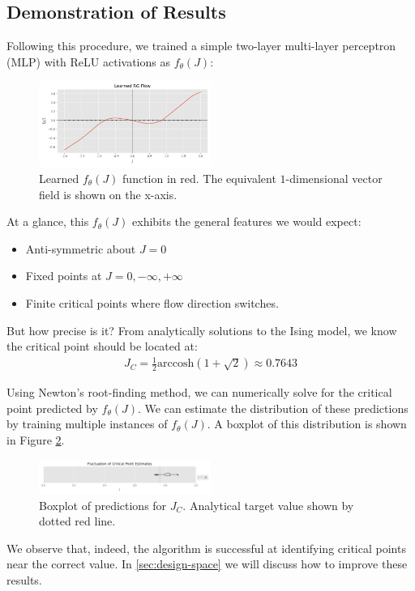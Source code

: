 \documentclass[%
    reprint,
    amsmath,amssymb,
    aps,
]{revtex4-2}
\begin{document}
\subsection{Demonstration of Results}

Following this procedure, we trained a simple two-layer multi-layer perceptron (MLP) with ReLU activations as $f_\theta(J)$:
\begin{figure}[h]
    \includegraphics[width=0.5\textwidth]{tex/images/a1_flows.png}
    \caption{\label{fig:a1-flow}
        Learned $f_\theta(J)$ function in red. 
        The equivalent $1$-dimensional vector field is shown on the x-axis. 
    }
\end{figure}

At a glance, this $f_\theta(J)$ exhibits the general features we would expect:
\begin{itemize}
    \item Anti-symmetric about $J=0$
    \item Fixed points at $J = 0, -\infty, +\infty$
    \item Finite critical points where flow direction switches. 
\end{itemize}

But how precise is it?
From analytically solutions to the Ising model, we know the critical point should be located at:
\begin{eqnarray}
    \label{eqn:ising-critical}
    J_C = \frac{1}{2} \text{arccosh}(1 + \sqrt{2}) \approx 0.7643
\end{eqnarray}

Using Newton's root-finding method, we can numerically solve for the critical point predicted by $f_\theta(J)$. 
We can estimate the distribution of these predictions by training multiple instances of $f_\theta(J)$. 
A boxplot of this distribution is shown in Figure \ref{fig:a1-boxplot}. 
\begin{figure}[h]
    \includegraphics[width=0.5\textwidth]{tex/images/a1_critical_points_boxplot.png}
    \caption{\label{fig:a1-boxplot}
        Boxplot of predictions for $J_C$. 
        Analytical target value shown by dotted red line. 
    }
\end{figure}
We observe that, indeed, the algorithm is successful at identifying critical points near the correct value. 
In \ref{sec:design-space} we will discuss how to improve these results. 
\end{document}
